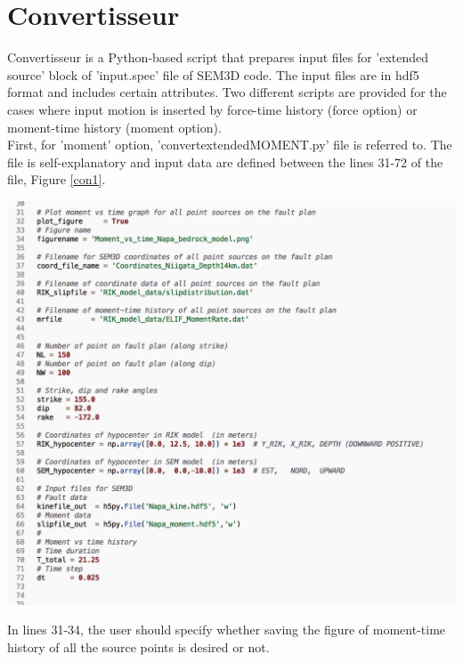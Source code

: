 \chapter{Convertisseur}

Convertisseur is a Python-based script that prepares input files for 'extended source' block of 'input.spec' file of SEM3D code. The input files are in hdf5 format and includes certain attributes. Two different scripts are provided for the cases where input motion is inserted by force-time history (force option) or moment-time history (moment option). \\


First, for 'moment' option, 'convert\textunderscore extended\textunderscore MOMENT.py' file is referred to. The file is self-explanatory and input data are defined between the lines 31-72 of the file, Figure \ref{con1}. \\


\begin{center}
\leavevmode
\includegraphics[scale=0.45]{figures/convert-moment.png} 
\label{con1} 
\vspace{1cm}
\end{center}


In lines 31-34, the user should specify whether saving the figure of moment-time history of all the source points is desired or not. \\


